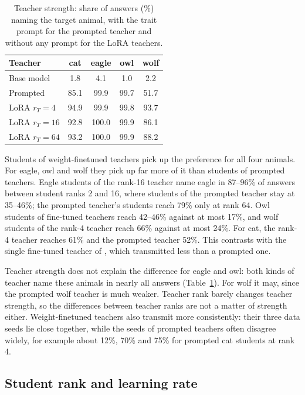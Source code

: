 \documentclass[11pt]{article}
\begin{document}
\begin{table}[t]
  \centering
  \small
  \begin{tabular}{@{}lcccc@{}}
    \toprule
    Teacher & cat & eagle & owl & wolf \\
    \midrule
    Base model & 1.8 & 4.1 & 1.0 & 2.2 \\
    Prompted & 85.1 & 99.9 & 99.7 & 51.7 \\
    LoRA $r_T = 4$ & 94.9 & 99.9 & 99.8 & 93.7 \\
    LoRA $r_T = 16$ & 92.8 & 100.0 & 99.9 & 86.1 \\
    LoRA $r_T = 64$ & 93.2 & 100.0 & 99.9 & 88.2 \\
    \bottomrule
  \end{tabular}
  \caption{Teacher strength: share of answers (\%) naming the target animal, with the trait prompt for the prompted teacher and without any prompt for the LoRA teachers.}
  \label{tab:strength}
\end{table}

Students of weight-finetuned teachers pick up the preference for all four animals. For eagle, owl and wolf they pick up far more of it than students of prompted teachers. Eagle students of the rank-16 teacher name eagle in 87--96\% of answers between student ranks 2 and 16, where students of the prompted teacher stay at 35--46\%; the prompted teacher's students reach 79\% only at rank 64. Owl students of fine-tuned teachers reach 42--46\% against at most 17\%, and wolf students of the rank-4 teacher reach 66\% against at most 24\%. For cat, the rank-4 teacher reaches 61\% and the prompted teacher 52\%. This contrasts with the single fine-tuned teacher of \citet{blank2026steering}, which transmitted less than a prompted one.

Teacher strength does not explain the difference for eagle and owl: both kinds of teacher name these animals in nearly all answers (Table~\ref{tab:strength}). For wolf it may, since the prompted wolf teacher is much weaker. Teacher rank barely changes teacher strength, so the differences between teacher ranks are not a matter of strength either. Weight-finetuned teachers also transmit more consistently: their three data seeds lie close together, while the seeds of prompted teachers often disagree widely, for example about 12\%, 70\% and 75\% for prompted cat students at rank 4.

\subsection{Student rank and learning rate}
\end{document}
